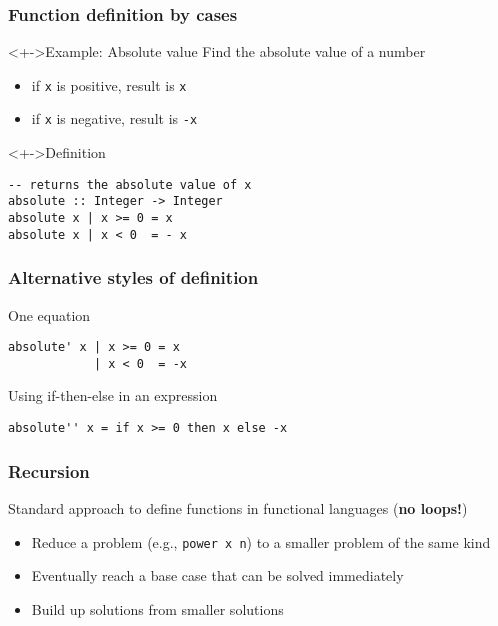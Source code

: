 \documentclass{beamer}
\subtitle{Functions}
\begin{document}
\begin{frame}
  \titlepage
\end{frame}
\begin{frame}[fragile]
  \frametitle{Function definition by cases}
  \begin{block}<+->{Example: Absolute value}
    Find the absolute value of a number
    \begin{itemize}
    \item if \texttt{x} is positive, result is \texttt{x}
    \item if \texttt{x} is negative, result is \texttt{-x}
    \end{itemize}
  \end{block}
  \begin{block}<+->{Definition}
\begin{verbatim}
-- returns the absolute value of x
absolute :: Integer -> Integer
absolute x | x >= 0 = x
absolute x | x < 0  = - x
\end{verbatim}
  \end{block}
\end{frame}

\begin{frame}
  \frametitle{Alternative styles of definition}
  
  \begin{block}{One equation}
\begin{verbatim}
absolute' x | x >= 0 = x
            | x < 0  = -x
\end{verbatim}
  \end{block}
  
  \begin{block}{Using if-then-else in an expression}
\begin{verbatim}
absolute'' x = if x >= 0 then x else -x
\end{verbatim}
  \end{block}
\end{frame}

\begin{frame}
  \frametitle{Recursion}
  Standard approach to define functions in functional languages
  (\textbf{no loops!})
  \begin{itemize}
  \item
    Reduce a problem (e.g., \texttt{power x n}) to a smaller
    problem of the same kind 
  \item Eventually reach a base case that can be solved immediately
  \item Build up solutions from smaller solutions
  \end{itemize}
\end{frame}
\end{document}

